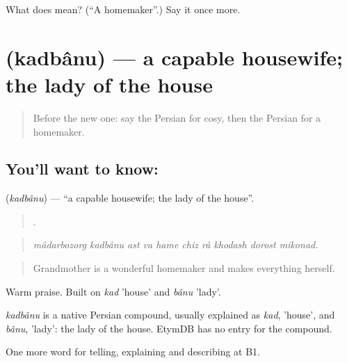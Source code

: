 \begin{tcolorbox}[breakable,colback=teal!4,colframe=teal!35!black,title={Before you move on}]
What does   mean? (\textquotedblleft{}A homemaker\textquotedblright{}.) Say it once more.
\end{tcolorbox}
\section[\texorpdfstring{\fa{کدبانو} (kadbânu)}{کدبانو (kadbânu)}]{ (kadbânu) — a capable housewife; the lady of the house}

\label{lesson:FA-C535-kadbanu}



\begin{quote}
Before the new one: say the Persian for cosy, then the Persian for a homemaker.
\end{quote}

\subsection*{You'll want to know: }
\textbf{} (\emph{kadbânu}) — \textquotedblleft{}a capable housewife; the lady of the house\textquotedblright{}.

\begin{quote}
         .
\end{quote}

\begin{quote}
\emph{mâdarbozorg kadbânu ast va hame chiz râ khodash dorost mikonad.}
\end{quote}

\begin{quote}
Grandmother is a wonderful homemaker and makes everything herself.
\end{quote}

Warm praise. Built on \emph{kad} 'house' and \emph{bânu} 'lady'.

\begin{cousinweb}
\emph{kadbânu} is a native Persian compound, usually explained as \emph{kad}, 'house', and \emph{bânu}, 'lady': the lady of the house. EtymDB has no entry for the compound.
\end{cousinweb}

\begin{grammarlens}[title={What you've built}]
One more word for telling, explaining and describing at B1.
\end{grammarlens}

